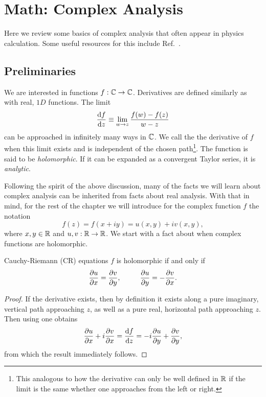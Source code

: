 \chapter{Math: Complex Analysis} 

Here we review some basics of complex analysis that often appear in physics
calculation. Some useful resources for this include
Ref.~\cite{brown_complex_2003,weber_essentials_2012}.

\section{Preliminaries}\label{sec:complexPrelim}

We are interested in functions $f:\mathbb{C}\to\mathbb{C}$. Derivatives are defined similarly as
with real, $1D$ functions. The limit
\begin{equation}\label{eq:cderiv}
  \dv{f}{z}\equiv\lim_{w\to z}\frac{f(w)-f(z)}{w-z}
\end{equation}
can be approached in infinitely many ways in $\mathbb{C}$. We call  the
the derivative of $f$ when this limit exists and is independent of the chosen
path\footnote{This analogous to how the derivative can only be well defined in
$\mathbb{R}$ if the limit is the same whether one approaches from the left or right.}.
The function is said to be {\it holomorphic}. If it can be expanded as a
convergent Taylor series, it is {\it analytic}.

Following the spirit of the above discussion, many of the facts we will learn
about complex analysis can be inherited from facts about real analysis. With
that in mind, for the rest of the chapter we will introduce for the complex
function $f$ the notation
\begin{equation}
  f(z)=f(x+iy)=u(x,y)+iv(x,y),
\end{equation}
where $x,y\in\mathbb{R}$ and $u,v:\mathbb{R}\to\mathbb{R}$. We start with a fact about when complex
functions are holomorphic.
\begin{theorem}{Cauchy-Riemann (CR) equations}{}
$f$ is holomorphic if and only if
$$
  \pdv{u}{x}=\pdv{v}{y},~~~~~~~~\pdv{u}{y}=-\pdv{v}{x}.
$$
\begin{proof}
If the derivative exists, then by definition
it exists along a pure imaginary, vertical path approaching $z$, as well
as a pure real, horizontal path approaching $z$.
Then using  one obtains
$$
\pdv{u}{x}+i\pdv{v}{x}=\dv{f}{z}=-i\pdv{u}{y}+\pdv{v}{y},
$$
from which the result immediately follows.
\end{proof}
\end{theorem}

